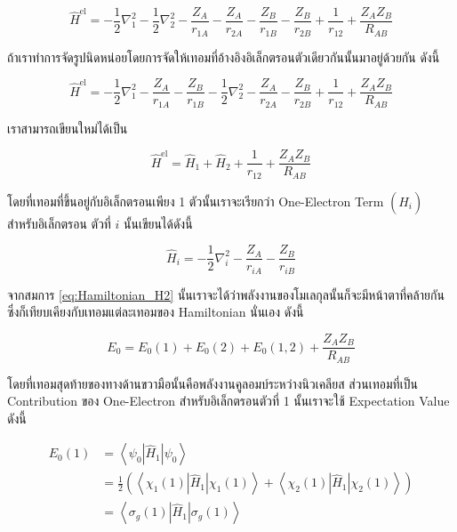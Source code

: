 \begin{equation}
  \label{eq:Hamiltonian_H2}
  \hat{H}^{\mathrm{el}}
  =
  -\frac{1}{2} \nabla_1^2
  -\frac{1}{2} \nabla_2^2
  -\frac{Z_A}{r_{1 A}}
  -\frac{Z_A}{r_{2 A}}
  -\frac{Z_B}{r_{1 B}}
  -\frac{Z_B}{r_{2 B}}
  +\frac{1}{r_{12}}
  +\frac{Z_A Z_B}{R_{A B}}
\end{equation}

\noindent ถ้าเราทำการจัดรูปนิดหน่อยโดยการจัดให้เทอมที่อ้างอิงอิเล็กตรอนตัวเดียวกันนั้นมาอยู่ด้วยกัน ดังนี้

\begin{equation}
  \hat{H}^{\mathrm{el}}
  =
  -\frac{1}{2} \nabla_1^2
  -\frac{Z_A}{r_{1 A}}
  -\frac{Z_B}{r_{1 B}}
  -\frac{1}{2} \nabla_2^2
  -\frac{Z_A}{r_{2 A}}
  -\frac{Z_B}{r_{2 B}}
  +\frac{1}{r_{12}}
  +\frac{Z_A Z_B}{R_{A B}}
\end{equation}

\noindent เราสามารถเขียนใหม่ได้เป็น

\begin{equation}
  \label{eq:Hamiltonian_H2_simple}
  \hat{H}^{\mathrm{el}}
  =
  \hat{H}_1
  + \hat{H}_2
  + \frac{1}{r_{12}}
  + \frac{Z_A Z_B}{R_{A B}}
\end{equation}

\noindent โดยที่เทอมที่ขึ้นอยู่กับอิเล็กตรอนเพียง 1 ตัวนั้นเราจะเรียกว่า One-Electron Term $(\hat{H}_i)$ สำหรับอิเล็กตรอน%
ตัวที่ $i$ นั้นเขียนได้ดังนี้

\begin{equation}
  \hat{H}_i
  =
  -\frac{1}{2} \nabla_i^2
  -\frac{Z_A}{r_{i A}}
  -\frac{Z_B}{r_{i B}}
\end{equation}

จากสมการ \eqref{eq:Hamiltonian_H2} นั้นเราจะได้ว่าพลังงานของโมเลกุลนั้นก็จะมีหน้าตาที่คล้ายกันซึ่งก็เทียบเคียงกับเทอมแต่ละเทอมของ
Hamiltonian นั่นเอง ดังนี้

\begin{equation}
  \label{eq:Energy_hydrogen_molecule}
  E_0 = E_0(1) + E_0(2) + E_0(1,2) + \frac{Z_A Z_B}{R_{A B}}
\end{equation}

\noindent โดยที่เทอมสุดท้ายของทางด้านขวามือนั้นคือพลังงานคูลอมบ์ระหว่างนิวเคลียส ส่วนเทอมที่เป็น Contribution ของ One-Electron
สำหรับอิเล็กตรอนตัวที่ 1 นั้นเราจะใช้ Expectation Value ดังนี้

\begin{equation}
  \begin{aligned}
    E_0(1)
     & = \left\langle\psi_0\left|\hat{H}_1\right| \psi_0\right\rangle \\
     & = \frac{1}{2}
    \left(
    \left\langle
    \chi_1(1)\left|\hat{H}_1\right| \chi_1(1)
    \right\rangle
    + \left\langle
    \chi_2(1)\left|\hat{H}_1\right| \chi_2(1)
    \right\rangle
    \right)                                                           \\
     & = \left\langle
    \sigma_g(1)\left|\hat{H}_1\right| \sigma_g(1)
    \right\rangle
  \end{aligned}
\end{equation}


